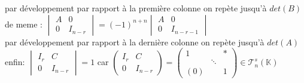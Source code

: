 \documentclass{article}
\begin{document}
    par développement par rapport à la première colonne on repète jusqu'à $det(B)$ \\
    de meme : $\begin{vmatrix} A & 0 \\ 0 & I_{n-r} \end{vmatrix}= (-1)^{n+n} \begin{vmatrix} A & 0 \\ 0 & I_{n-r-1} \end{vmatrix}$ \\
      par développement par rapport à la dernière colonne on repète jusqu'à $det(A)$ \\
      enfin: $\begin{vmatrix} I_r& C \\ 0 & I_{n-r} \end{vmatrix}=1$ car $\begin{pmatrix} I_r & C \\ 0 & I_{n-r} \end{pmatrix}= \begin{pmatrix} 1& & \ast \\  & \ddots \\ (0) & & 1 \end{pmatrix} \in \mathcal T^s_n(\mathbb K)$
\end{document}
